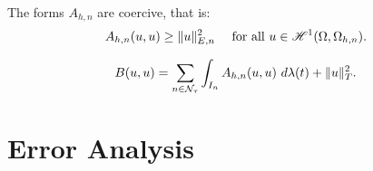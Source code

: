 \begin{lemma}[Coercivity of $A_{h, n}$]
    The forms $A_{h, n}$ are coercive, that is:
    \begin{gather}
        A_{h, n}(u, u) \geq \lVert u \rVert_{E, n}^2 \quad \text{ for all } u \in \mathscr{H}^{1}(\Omega, \Omega_{h, n}).
    \end{gather}
\end{lemma}

\begin{lemma}[Coercivity of $B$]
    \begin{gather}
        B(u, u) = \sum_{n \in \mathcal{N}_{\tau}} \int_{I_n} A_{h, n}(u, u) ~ d \lambda(t) + \lVert u \rVert_{T}^2.
    \end{gather}
\end{lemma}

\newpage
\section{Error Analysis}